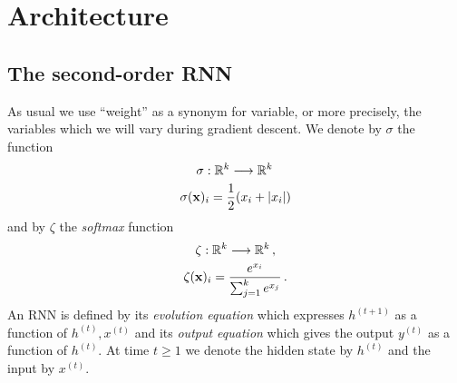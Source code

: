 \documentclass[english,letter paper,12pt,leqno]{article}
\theoremstyle{example}
\numberwithin{equation}{section}
\begin{document}
\section{Architecture}

\subsection{The second-order RNN}

As usual we use ``weight'' as a synonym for variable, or more precisely, the variables which we will vary during gradient descent. We denote by $\sigma$ the function
\begin{gather*}
\sigma: \mathbb{R}^k \longrightarrow \mathbb{R}^k\,\\
\sigma( \bold{x} )_i = \frac{1}{2}( x_i + |x_i| )
\end{gather*}
and by $\zeta$ the \emph{softmax} function
\begin{gather*}
\zeta: \mathbb{R}^k \longrightarrow \mathbb{R}^k\,,\\
\zeta(\bold{x})_i = \frac{e^{x_i}}{\sum_{j=1}^k e^{x_j}}\,.
\end{gather*}
An RNN is defined by its \emph{evolution equation} which expresses $h^{(t+1)}$ as a function of $h^{(t)}, x^{(t)}$ and its \emph{output equation} which gives the output $y^{(t)}$ as a function of $h^{(t)}$. At time $t \ge 1$ we denote the hidden state by $h^{(t)}$ and the input by $x^{(t)}$. 
\end{document}

